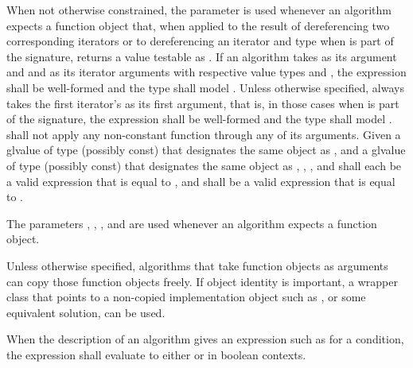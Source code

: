 \pnum
When not otherwise constrained, the  parameter is used
whenever an algorithm expects a function object that, when applied
to the result of dereferencing two corresponding iterators or
to dereferencing an iterator and type 
when  is part of the signature,
returns a value testable as .
If an algorithm takes  as its argument and
 and  as its iterator arguments
with respective value types  and ,
the expression  shall be well-formed and
the type  shall model
.
Unless otherwise specified,
 always takes the first iterator's 
as its first argument, that is, in those cases when 
is part of the signature,
the expression  shall be well-formed and
the type  shall model
.
 shall not apply any non-constant function
through any of its arguments.
Given a glvalue  of type (possibly const) 
that designates the same object as , and
a glvalue  of type (possibly const) 
that designates the same object as ,
,
, and
shall each be a valid expression that is equal to
, and
shall be a valid expression that is equal to
.

\pnum
The parameters
,
,
,
and 
are used
whenever an algorithm expects a function object.

\pnum
\begin{note}
Unless otherwise specified, algorithms that take function objects as arguments
can copy those function objects freely.
If object identity is important,
a wrapper class that points to a non-copied implementation object
such as , or some equivalent solution,
can be used.
\end{note}

\pnum
When the description of an algorithm gives an expression such as
 for a condition, the expression
shall evaluate to either  or  in boolean contexts.

